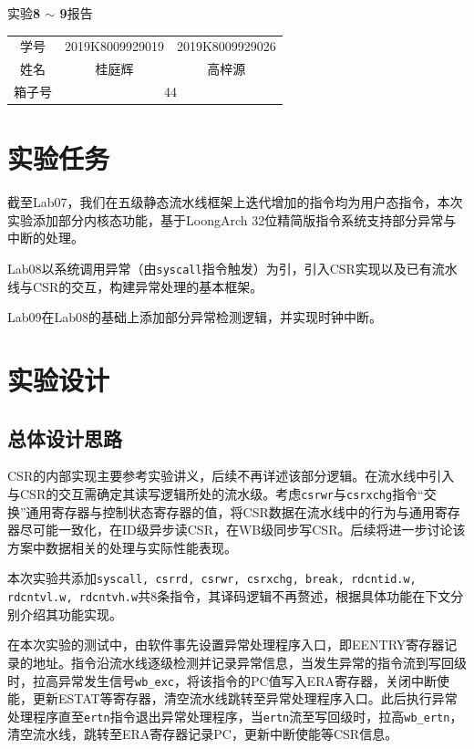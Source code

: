 \documentclass[UTF-8,twoside,cs4size]{ctexart}
\begin{document}
	\begin{center}
		\heiti{}
		实验\textbf{8 $ \bm\sim $ 9}报告
	\end{center}

	\begin{table}[!h]
		\raggedleft
		\begin{tabular}{ccc}
			{\heiti 学号} & {2019K8009929019} & {2019K8009929026} \\
			{\heiti 姓名} & 桂庭辉 & 高梓源 \\
			{\heiti 箱子号} & \multicolumn{2}{c}{44}
		\end{tabular}
	\end{table}
	
	\section{实验任务}
	
	截至Lab07，我们在五级静态流水线框架上迭代增加的指令均为用户态指令，本次实验添加部分内核态功能，基于LoongArch 32位精简版指令系统支持部分异常与中断的处理。
    
    Lab08以系统调用异常（由\texttt{syscall}指令触发）为引，引入CSR实现以及已有流水线与CSR的交互，构建异常处理的基本框架。
    
    Lab09在Lab08的基础上添加部分异常检测逻辑，并实现时钟中断。
	
	\section{实验设计}
    \subsection{总体设计思路}
    
    CSR的内部实现主要参考实验讲义，后续不再详述该部分逻辑。在流水线中引入与CSR的交互需确定其读写逻辑所处的流水级。考虑\texttt{csrwr}与\texttt{csrxchg}指令“交换”通用寄存器与控制状态寄存器的值，将CSR数据在流水线中的行为与通用寄存器尽可能一致化，在ID级异步读CSR，在WB级同步写CSR。后续将进一步讨论该方案中数据相关的处理与实际性能表现。
    
    本次实验共添加\texttt{syscall, csrrd, csrwr, csrxchg, break, rdcntid.w, rdcntvl.w, rdcntvh.w}共8条指令，其译码逻辑不再赘述，根据具体功能在下文分别介绍其功能实现。
    
    在本次实验的测试中，由软件事先设置异常处理程序入口，即EENTRY寄存器记录的地址。指令沿流水线逐级检测并记录异常信息，当发生异常的指令流到写回级时，拉高异常发生信号\texttt{wb\_exc}，将该指令的PC值写入ERA寄存器，关闭中断使能，更新ESTAT等寄存器，清空流水线跳转至异常处理程序入口。此后执行异常处理程序直至\texttt{ertn}指令退出异常处理程序，当\texttt{ertn}流至写回级时，拉高\texttt{wb\_ertn}，清空流水线，跳转至ERA寄存器记录PC，更新中断使能等CSR信息。
    
\end{document}
